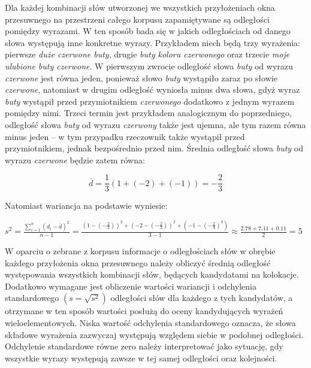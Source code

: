 \par
Dla każdej kombinacji słów utworzonej we wszystkich przyłożeniach okna przesuwnego na przestrzeni całego korpusu zapamiętywane są odległości pomiędzy wyrazami.
W ten sposób bada się w jakich odległościach od danego słowa występują inne konkretne wyrazy.
Przykładem niech będą trzy wyrażenia: pierwsze \emph{duże czerwone buty}, drugie \emph{buty koloru czerwonego} oraz trzecie \emph{moje ulubione buty czerwone}.
W pierwszym zwrocie odległość słowa \emph{buty} od wyrazu \emph{czerwone} jest równa jeden, ponieważ słowo \emph{buty} wystąpiło zaraz po słowie \emph{czerwone}, natomiast w drugim odległość wyniosła minus dwa słowa, gdyż wyraz \emph{buty} wystąpił przed przymiotnikiem \emph{czerwonego} dodatkowo z jednym wyrazem pomiędzy nimi.
Trzeci termin jest przykładem analogicznym do poprzedniego, odległość słowa \emph{buty} od wyrazu \emph{czerwony} także jest ujemna, ale tym razem równa minus jeden -- w tym przypadku rzeczownik także wystąpił przed przymiotnikiem, jednak bezpośrednio przed nim.
Średnia odległość słowa \emph{buty} od wyrazu \emph{czerwone} będzie zatem równa: 

$$ \bar{d} = \frac{1}{3}(1 + (-2) + (-1)) = -\frac{2}{3} $$

Natomiast wariancja na podstawie \cite[str. 159]{mit} wyniesie:
\begin{center}
\( s^2 = 
\frac{
	\sum_{i=1}^{n}(d_{i} - \bar{d})^2
}{n - 1} = 
\frac{
	(1 - (-\frac{2}{3}))^2 + 
	(-2 - (-\frac{2}{3}))^2 + 
	(-1 - (-\frac{2}{3})^2)
}{3 - 1} 
\approx \frac{2.78 + 7.11 + 0.11}{2} = 5 \)
\end{center}

\par
W oparciu o zebrane z korpusu informacje o odległościach słów w obrębie każdego przyłożenia okna przesuwnego należy obliczyć średnią odległość występowania wszystkich kombinacji słów, będących kandydatami na kolokacje.
Dodatkowo wymagane jest obliczenie wartości wariancji i odchylenia standardowego $ ( s = \sqrt{s^2} ) $ odległości słów dla każdego z tych kandydatów, a otrzymane w ten sposób wartości posłużą do oceny kandydujących wyrażeń wieloelementowych.
Niska wartość odchylenia standardowego oznacza, że słowa składowe wyrażenia zazwyczaj występują względem siebie w podobnej odległości.
Odchylenie standardowe równe zero należy interpretować jako sytuację, gdy wszystkie wyrazy występują zawsze w tej samej odległości oraz kolejności. \cite[str. 158, 159]{mit}

